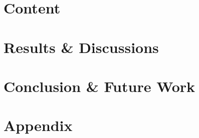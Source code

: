 \documentclass[%
]{tumDiss}
\begin{document}
\chapter{Content}
\label{chap:content}



\chapter{Results \& Discussions}
\label{chap:results}



\chapter{Conclusion \& Future Work}
\label{chap:conclusion}



\backmatter




\appendix
\chapter{Appendix}



\end{document}
